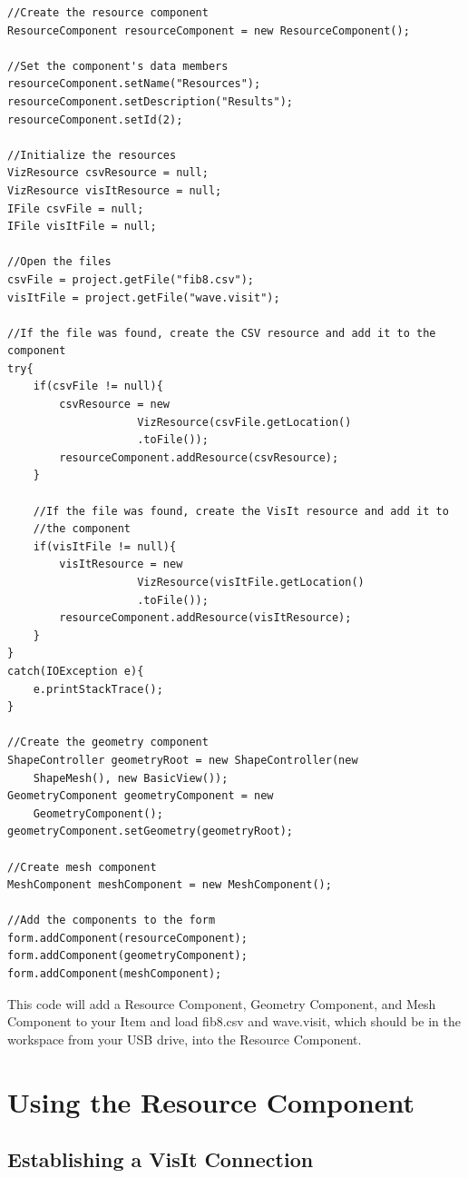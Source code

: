 \documentclass{article}
\begin{document}
\begin{verbatim}
//Create the resource component
ResourceComponent resourceComponent = new ResourceComponent();

//Set the component's data members
resourceComponent.setName("Resources");
resourceComponent.setDescription("Results");
resourceComponent.setId(2);

//Initialize the resources
VizResource csvResource = null;
VizResource visItResource = null;
IFile csvFile = null;
IFile visItFile = null;

//Open the files
csvFile = project.getFile("fib8.csv");
visItFile = project.getFile("wave.visit");

//If the file was found, create the CSV resource and add it to the component
try{
	if(csvFile != null){
		csvResource = new 
                    VizResource(csvFile.getLocation()
                    .toFile());
    	resourceComponent.addResource(csvResource);
	}
		        
	//If the file was found, create the VisIt resource and add it to 
	//the component
	if(visItFile != null){
		visItResource = new 
                    VizResource(visItFile.getLocation()
                    .toFile());
		resourceComponent.addResource(visItResource);
	}
}
catch(IOException e){
	e.printStackTrace();
}

//Create the geometry component
ShapeController geometryRoot = new ShapeController(new
    ShapeMesh(), new BasicView());
GeometryComponent geometryComponent = new 
    GeometryComponent();
geometryComponent.setGeometry(geometryRoot);

//Create mesh component
MeshComponent meshComponent = new MeshComponent();

//Add the components to the form
form.addComponent(resourceComponent);
form.addComponent(geometryComponent);
form.addComponent(meshComponent);	
\end{verbatim}

This code will add a Resource Component, Geometry Component, and Mesh Component
to your Item and load fib8.csv and wave.visit, which should be in the workspace
from your USB drive, into the Resource Component.


\section{Using the Resource Component}

\subsection{Establishing a VisIt Connection}
\end{document}
